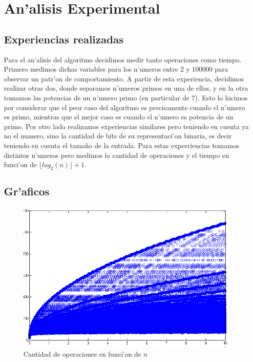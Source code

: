\section{An'alisis Experimental}
\subsection{Experiencias realizadas}
Para el an'alisis del algoritmo decidimos medir tanto operaciones como tiempo. Primero medimos dichas variables 
para los n'umeros entre 2 y 100000 para observar un patr'on de comportamiento. A partir de esta experiencia, 
decidimos realizar otras dos, donde separamos n'umeros primos en una de ellas, y en la otra tomamos las potencias 
de un n'umero primo (en particular de 7). Esto lo hicimos por considerar que el peor caso del algoritmo es 
precisamente cuando el n'umero es primo, mientras que el mejor caso es cuando el n'umero es potencia de un primo. 
Por otro lado realizamos experiencias similares pero teniendo en cuenta ya no el numero, sino la cantidad de bits 
de su representaci'on binaria, es decir teniendo en cuenta el tama\~{n}o de la entrada. Para estas experriencias 
tomamos distintos n'umeros pero medimos la cantidad de operaciones y el tiempo en funci'on de $\lfloor log_2(n) \rfloor + 1$.


\subsection{Gr'aficos}
\begin{figure}[H]
\centering
\includegraphics[scale=0.8]{../../codigo/ejercicio1/benchmark/graficos/todos_los_numeros/graficosTodos.png}
\caption{Cantidad de operaciones en funci'on de $n$}
\end{figure}

